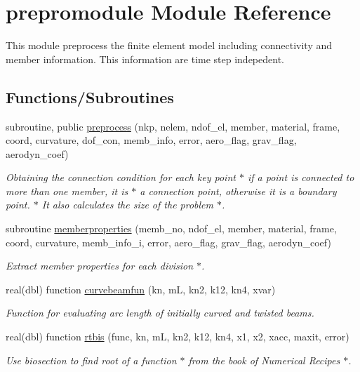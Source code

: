 \hypertarget{namespaceprepromodule}{}\section{prepromodule Module Reference}
\label{namespaceprepromodule}


This module preprocess the finite element model including connectivity and member information. This information are time step indepedent.  


\subsection*{Functions/\+Subroutines}
\begin{DoxyCompactItemize}
\item 
subroutine, public \hyperlink{namespaceprepromodule_a4c7a91f217e227051ae54c12a67e702e}{preprocess} (nkp, nelem, ndof\+\_\+el, member, material, frame, coord, curvature, dof\+\_\+con, memb\+\_\+info, error, aero\+\_\+flag, grav\+\_\+flag, aerodyn\+\_\+coef)
\begin{DoxyCompactList}\small\item\em Obtaining the connection condition for each key point $\ast$ if a point is connected to more than one member, it is $\ast$ a connection point, otherwise it is a boundary point. $\ast$ It also calculates the size of the problem $\ast$. \end{DoxyCompactList}\item 
subroutine \hyperlink{namespaceprepromodule_a2011e4ceff94f407d454a10cc186d45b}{memberproperties} (memb\+\_\+no, ndof\+\_\+el, member, material, frame, coord, curvature, memb\+\_\+info\+\_\+i, error, aero\+\_\+flag, grav\+\_\+flag, aerodyn\+\_\+coef)
\begin{DoxyCompactList}\small\item\em Extract member properties for each division $\ast$. \end{DoxyCompactList}\item 
real(dbl) function \hyperlink{namespaceprepromodule_aba8b0787c8f7aa138ead8a8c9161bc4b}{curvebeamfun} (kn, mL, kn2, k12, kn4, xvar)
\begin{DoxyCompactList}\small\item\em Function for evaluating arc length of initially curved and twisted beams. \end{DoxyCompactList}\item 
real(dbl) function \hyperlink{namespaceprepromodule_a078487e47a4a49a0b7f7c94be9f2c8f9}{rtbis} (func, kn, mL, kn2, k12, kn4, x1, x2, xacc, maxit, error)
\begin{DoxyCompactList}\small\item\em Use biosection to find root of a function $\ast$ from the book of Numerical Recipes $\ast$. \end{DoxyCompactList}\end{DoxyCompactItemize}
